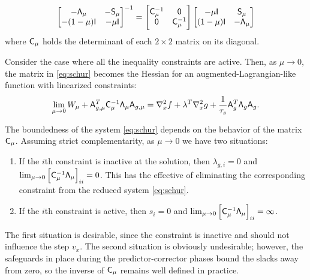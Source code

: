 \begin{remark}
\begin{equation*}
\begin{bmatrix}
 -\mathsf{\Lambda}_\mu & -\mathsf{S}_\mu \\ 
 -(1-\mu)\mathsf{I} & -\mu \mathsf{I}  
\end{bmatrix}^{-1} 
= 
\begin{bmatrix}
  \mathsf{C}_\mu^{-1} & \mathsf{0} \\
    \mathsf{0} & \mathsf{C}_\mu^{-1}
  \end{bmatrix}
  \begin{bmatrix}
   -\mu \mathsf{I} & \mathsf{S}_\mu \\
    (1-\mu)\mathsf{I} & -\mathsf{\Lambda}_\mu 
  \end{bmatrix}
\end{equation*}
where $\mathsf{C}_\mu$ holds the determinant of each $2\times 2$ matrix on its diagonal.

\end{remark}

\begin{remark}
  Consider the case where all the inequality constraints are active.  Then, as
  $\mu\rightarrow 0$, the matrix in \eqref{eq:schur} becomes the Hessian for an
  augmented-Lagrangian-like function with linearized constraints:
  \begin{equation*}
    \lim_{\mu\rightarrow 0} W_{\mu} + \mathsf{A}_{g,\mu}^T \mathsf{C}_{\mu}^{-1}
    \mathsf{\Lambda}_\mu \mathsf{A}_{g,\mu} = \nabla_x^{2} f + \lambda^T \nabla_x^2 g +
    \frac{1}{\tau_s}\mathsf{A}_g^{T} \mathsf{\Lambda}_g \mathsf{A}_g.
  \end{equation*}
\end{remark}


The boundedness of the system \eqref{eq:schur} depends on the behavior of the
matrix $\mathsf{C}_{\mu}$.  Assuming strict complementarity, as $\mu\rightarrow 0$
we have two situations:
\begin{enumerate}
\item If the $i$th constraint is inactive at the solution, then $\lambda_{g,i} = 0$ and
  $\lim_{\mu\rightarrow 0} \left[\mathsf{C}_\mu^{-1} \mathsf{\Lambda}_\mu \right]_{ii}
  = 0$.  This has the effective of eliminating the corresponding constraint from
  the reduced system \eqref{eq:schur}.

\item If the $i$th constraint is active, then $s_i = 0$ and $\lim_{\mu\rightarrow 0}
  \left[\mathsf{C}_\mu^{-1} \mathsf{\Lambda}_\mu \right]_{ii} = \infty$.
\end{enumerate}
The first situation is desirable, since the constraint is inactive and should
not influence the step $v_x$.  The second situation is obviously undesirable;
however, the safeguards in place during the predictor-corrector phases bound the
slacks away from zero, so the inverse of $\mathsf{C}_{\mu}$ remains well defined in practice.

